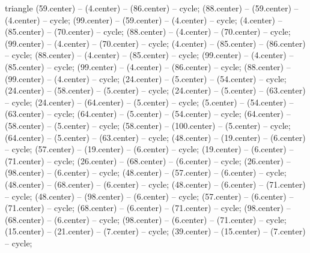 \begin{pgfonlayer}{triangle}
 (59.center) -- (4.center) -- (86.center) -- cycle; 
 (88.center) -- (59.center) -- (4.center) -- cycle; 
 (99.center) -- (59.center) -- (4.center) -- cycle; 
 (4.center) -- (85.center) -- (70.center) -- cycle; 
 (88.center) -- (4.center) -- (70.center) -- cycle; 
 (99.center) -- (4.center) -- (70.center) -- cycle; 
 (4.center) -- (85.center) -- (86.center) -- cycle; 
 (88.center) -- (4.center) -- (85.center) -- cycle; 
 (99.center) -- (4.center) -- (85.center) -- cycle; 
 (99.center) -- (4.center) -- (86.center) -- cycle; 
 (88.center) -- (99.center) -- (4.center) -- cycle; 
 (24.center) -- (5.center) -- (54.center) -- cycle; 
 (24.center) -- (58.center) -- (5.center) -- cycle; 
 (24.center) -- (5.center) -- (63.center) -- cycle; 
 (24.center) -- (64.center) -- (5.center) -- cycle; 
 (5.center) -- (54.center) -- (63.center) -- cycle; 
 (64.center) -- (5.center) -- (54.center) -- cycle; 
 (64.center) -- (58.center) -- (5.center) -- cycle; 
 (58.center) -- (100.center) -- (5.center) -- cycle; 
 (64.center) -- (5.center) -- (63.center) -- cycle; 
 (48.center) -- (19.center) -- (6.center) -- cycle; 
 (57.center) -- (19.center) -- (6.center) -- cycle; 
 (19.center) -- (6.center) -- (71.center) -- cycle; 
 (26.center) -- (68.center) -- (6.center) -- cycle; 
 (26.center) -- (98.center) -- (6.center) -- cycle; 
 (48.center) -- (57.center) -- (6.center) -- cycle; 
 (48.center) -- (68.center) -- (6.center) -- cycle; 
 (48.center) -- (6.center) -- (71.center) -- cycle; 
 (48.center) -- (98.center) -- (6.center) -- cycle; 
 (57.center) -- (6.center) -- (71.center) -- cycle; 
 (68.center) -- (6.center) -- (71.center) -- cycle; 
 (98.center) -- (68.center) -- (6.center) -- cycle; 
 (98.center) -- (6.center) -- (71.center) -- cycle; 
 (15.center) -- (21.center) -- (7.center) -- cycle; 
 (39.center) -- (15.center) -- (7.center) -- cycle; 

\end{pgfonlayer}
